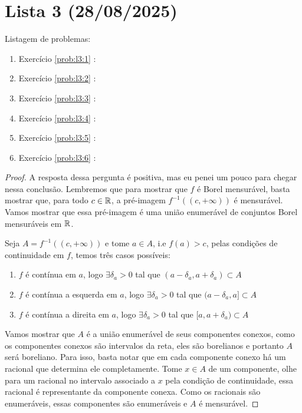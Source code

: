 \clearpage
\section{Lista 3 (28/08/2025)}

Listagem de problemas:
\begin{enumerate}
    \item Exercício \ref{prob:l3:1} : \checkmark
    \item Exercício \ref{prob:l3:2} : \checkmark
    \item Exercício \ref{prob:l3:3} : \checkmark
    \item Exercício \ref{prob:l3:4} : \checkmark
    \item Exercício \ref{prob:l3:5} : \checkmark
    \item Exercício \ref{prob:l3:6} : \checkmark
\end{enumerate}

\begin{problem}
    \label{prob:l3:1}
\end{problem}
\begin{proof}
    A resposta dessa pergunta é positiva, mas eu penei um pouco para chegar nessa conclusão. Lembremos 
    que para mostrar que $f$ é Borel mensurável, basta mostrar que, para todo $c \in \mathbb{R}$, a pré-imagem 
    $f^{-1}((c, +\infty))$ é mensurável. Vamos mostrar que essa pré-imagem é uma união enumerável de conjuntos
    Borel mensuráveis em $\mathbb{R}$.

    Seja $A = f^{-1}((c, +\infty))$ e tome $a \in A$, i.e $f(a) > c$, pelas condições de continuidade em $f$, temos três casos possíveis:
    \begin{enumerate}
        \item $f$ é contínua em $a$, logo $\exists \delta_a > 0$ tal que $(a - \delta_a, a + \delta_a) \subset A$
        \item $f$ é contínua a esquerda em $a$, logo $\exists \delta_a > 0$ tal que $(a - \delta_a, a] \subset A$
        \item $f$ é contínua a direita em $a$, logo $\exists \delta_a > 0$ tal que $[a, a + \delta_a) \subset A$
    \end{enumerate}
    Vamos mostrar que $A$ é a união enumerável de seus componentes conexos, como os componentes conexos são intervalos
    da reta, eles são borelianos e portanto $A$ será boreliano. Para isso, basta notar que em cada componente conexo 
    há um racional que determina ele completamente. Tome $x \in A$ de um componente, olhe para 
    um racional no intervalo associado a $x$ pela condição 
    de continuidade, essa racional é representante da componente conexa. 
    Como os racionais são enumeráveis, essas componentes são enumeráveis e $A$ é mensurável.
\end{proof}

